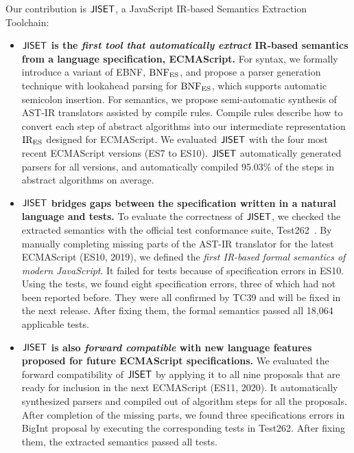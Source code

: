Our contribution is \( \text{\sf JISET} \), a JavaScript IR-based Semantics Extraction
Toolchain:
\begin{itemize}[leftmargin=0.5cm]
  \item \textbf{\( \text{\sf JISET} \) is the \textit{first tool that automatically
    extract} IR-based semantics from a language specification, ECMAScript.}
    For syntax, we formally introduce a variant of EBNF, \( \text{BNF}_{\text{ES}} \),
    and propose a parser generation technique with
    lookahead parsing for \( \text{BNF}_{\text{ES}} \), which supports automatic semicolon
    insertion. For semantics, we propose semi-automatic synthesis of AST-IR
    translators assisted by compile rules.  Compile rules describe
    how to convert each step of abstract algorithms into our intermediate
    representation \( \text{IR}_\text{ES} \) designed for ECMAScript. We evaluated \( \text{\sf JISET} \)
    with the four most recent ECMAScript versions (ES7 to ES10).   \( \text{\sf JISET} \)
    automatically generated parsers for all versions, and automatically compiled
    95.03\% of the steps in abstract algorithms on average.
  \item \textbf{\( \text{\sf JISET} \) bridges gaps between the specification written in a
    natural language and tests.}
    To evaluate the correctness of \( \text{\sf JISET} \), we checked the extracted
    semantics with the official test conformance suite, Test262~\cite{test262}.
    By manually completing missing parts of the AST-IR translator for the latest
    ECMAScript (ES10, 2019), we defined the \textit{first IR-based formal
    semantics of modern JavaScript}. It failed for  tests because of
    specification errors in ES10. Using the tests, we found eight specification errors,
    three of which had not been reported before. They were all confirmed by
    TC39 and will be fixed in the next release.  After fixing them, the formal
    semantics passed all 18,064 applicable tests.
  \item \textbf{\( \text{\sf JISET} \) is also \textit{forward compatible} with new
    language features proposed for future ECMAScript specifications.}
    We evaluated the forward compatibility of \( \text{\sf JISET} \) by applying it to all
    nine proposals that are ready for inclusion in the next ECMAScript
    (ES11, 2020).  It automatically synthesized parsers and compiled 
    out of  algorithm steps for all the proposals.  After completion
    of the missing parts, we found three specifications errors in BigInt
    proposal by executing the corresponding tests in Test262.  After fixing
    them, the extracted semantics passed all  tests.
\end{itemize}
